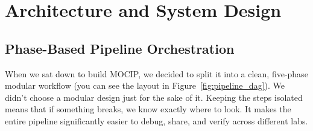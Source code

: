 \documentclass[12pt,a4paper,onecolumn]{article}
\begin{document}
\section{Architecture and System Design}

\subsection{Phase-Based Pipeline Orchestration}
When we sat down to build MOCIP, we decided to split it into a clean, five-phase modular workflow (you can see the layout in Figure~\ref{fig:pipeline_dag}). We didn't choose a modular design just for the sake of it. Keeping the steps isolated means that if something breaks, we know exactly where to look. It makes the entire pipeline significantly easier to debug, share, and verify across different labs.
\end{document}
